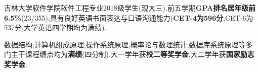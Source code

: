 \par{
\quad{}吉林大学软件学院软件工程专业2018级学生(现大三).前五学期\textbf{GPA排名居年级前6.5\%}(23/355),具有良好英语书面表达与口语沟通能力(\textbf{CET-4为596分},CET-6为537分,大学英语四学期均为满绩).

\quad{}数据结构,计算机组成原理,操作系统原理,概率论与数理统计,数据库系统原理等多门主干课程绩点均为\textbf{满绩}(四分制).大一学年获\textbf{校二等奖学金},大二学年获\textbf{国家励志奖学金}.
}